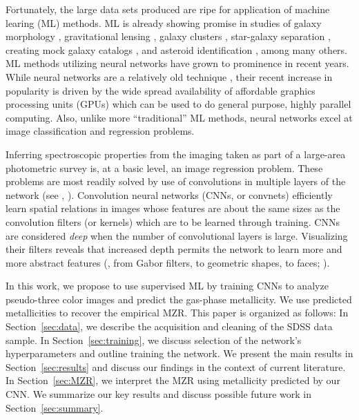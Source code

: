 \documentclass[fleqn,usenatbib]{mnras}
\begin{document}
Fortunately, the large data sets produced are ripe for application of machine learing (ML) methods. ML is already showing promise in studies of galaxy morphology , gravitational lensing , galaxy clusters , star-galaxy separation , creating mock galaxy catalogs , and asteroid identification , among many others. ML methods utilizing neural networks have grown to prominence in recent years. While neural networks are a relatively old technique , their recent increase in popularity is driven by the wide spread availability of affordable graphics processing units (GPUs) which can be used to do general purpose, highly parallel computing. Also, unlike more ``traditional'' ML methods, neural networks excel at image classification and regression problems.

Inferring spectroscopic properties from the imaging taken as part of a large-area photometric survey is, at a basic level, an image regression problem. These problems are most readily solved by use of convolutions in multiple layers of the network (see \eg, \citealt{Krizhevsky2012}). Convolution neural networks (CNNs, or convnets) efficiently learn spatial relations in images whose features are about the same sizes as the convolution filters (or kernels) which are to be learned through training. CNNs are considered \textit{deep} when the number of convolutional layers is large. Visualizing their filters reveals that increased depth permits the network to learn more and more abstract features (\eg, from Gabor filters, to geometric shapes, to faces; \citealt{Zeiler2014}).

In this work, we propose to use supervised ML by training CNNs to analyze pseudo-three color images and predict the gas-phase metallicity. We use predicted metallicities to recover the empirical \cite{Tremonti2004} MZR. This paper is organized as follows: In Section~\ref{sec:data}, we describe the acquisition and cleaning of the SDSS data sample. In Section~\ref{sec:training}, we discuss selection of the network's hyperparameters and outline training the network. We present the main results in Section~\ref{sec:results} and discuss our findings in the context of current literature. In Section~\ref{sec:MZR}, we interpret the MZR using metallicity predicted by our CNN. We summarize our key results and discuss possible future work in Section~\ref{sec:summary}.
\end{document}
